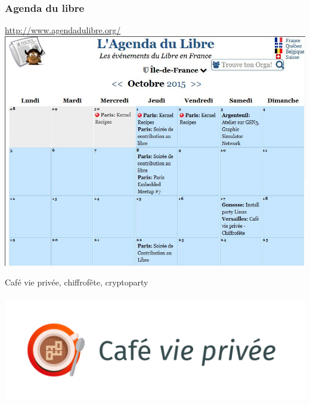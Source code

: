 \documentclass{beamer}
\begin{document}
\begin{frame}
\frametitle{Agenda du libre }
\begin{center}
\url{http://www.agendadulibre.org/}
\\
\includegraphics[scale=0.55] {./images/agenda-du-libre.jpg}
\end{center} 
\end{frame}

\begin{frame}
\begin{center}
\Huge{Café vie privée, chiffrofête, cryptoparty}
\\~\\
\includegraphics[scale=0.3] {./images/LogoCafeViePrivee.jpg}
\end{center}
\end{frame}
\end{document}
